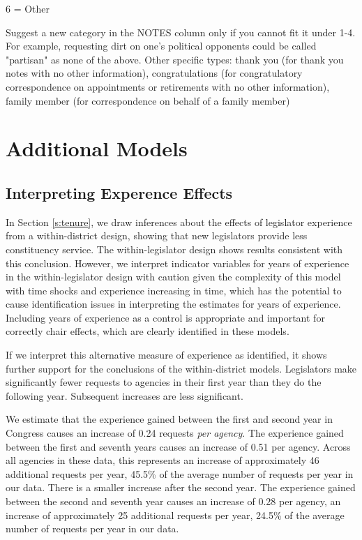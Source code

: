 6 = Other \\

\hfill\begin{minipage}{\dimexpr\textwidth-2cm}
	Suggest a new category in the NOTES column only if you cannot fit it under 1-4. For example, requesting dirt on one's political opponents could be called "partisan" as none of the above. Other specific types: thank you (for thank you notes with no other information), congratulations (for congratulatory correspondence on appointments or retirements with no other information), family member (for correspondence on behalf of a family member) \\
\end{minipage}

\clearpage


\section{Additional Models} \label{s:appendix_models}

\subsection{Interpreting Experence Effects }

In Section \ref{s:tenure}, we draw inferences about the effects of legislator experience from a within-district design, showing that new legislators provide less constituency service. The within-legislator design shows results consistent with this conclusion. However, we interpret indicator variables for years of experience in the within-legislator design with caution given the complexity of this model with time shocks and experience increasing in time, which has the potential to cause identification issues in interpreting the estimates for years of experience. Including years of experience as a control is appropriate and important for correctly chair effects, which are clearly identified in these models.  

If we interpret this alternative measure of experience as identified, it shows further support for the conclusions of the within-district models. Legislators make significantly fewer requests to agencies in their first year than they do the following year. Subsequent increases are less significant.  

We estimate that the experience gained between the first and second year in Congress causes an increase of 0.24 requests \textit{per agency}. The experience gained between the first and seventh years causes an increase of 0.51 per agency. Across all  agencies in these data, this represents an increase of approximately 46 additional requests per year, 45.5\% of the average number of requests per year in our data. There is a smaller increase after the second year. The experience gained between the second and seventh year causes an increase of 0.28 per agency, an increase of approximately 25 additional requests per year, 24.5\% of the average number of requests per year in our data.

